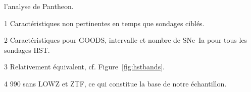 \documentclass[../main/main.tex]{subfiles}
\begin{document}
\begin{table}[ht]
\begin{threeparttable}
\begin{tablenotes}[flushleft]
            l'analyse de Pantheon.
        \item [1] \small  Caractéristiques non pertinentes en temps que sondages
            ciblés.
        \item [2] \small Caractéristiques pour GOODS, intervalle et nombre de
            SNe~Ia pour tous les sondages HST.
        \item [3] \small Relativement équivalent, cf. Figure~\ref{fig:hstbands}.
        \item [4] \small 990 sans LOWZ et ZTF, ce qui constitue la base de notre
            échantillon.
        \end{tablenotes}
    \end{threeparttable}
\end{table}
\shorthandon{:}
\vfill

% 
% 
\end{document}

